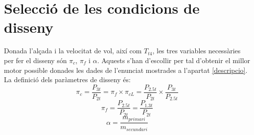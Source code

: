 \section{Selecció de les condicions de disseny}
Donada l'alçada i la velocitat de vol, així com $T_{t4}$, les tres variables necessàries per fer el disseny són $\pi_c$, $\pi_f$ i $\alpha$. Aquests s'han d'escollir per tal d'obtenir el millor motor possible donades les dades de l'enunciat mostrades a l'apartat \ref{descripcio}.
La definició dels paràmetres de disseny és:
\begin{equation*}
	\pi_c = \frac{P_{3t}}{P_{2t}} = \pi_{f}\times\pi_{cL} = \frac{P_{2.5t}}{P_{2t}} \times \frac{P_{3t}}{P_{2.5t}}
\end{equation*}
\begin{equation*}
	\pi_f = \frac{P_{2.5t}}{P_{2t}} = \frac{P_{1.3t}}{P_{2t}} 
\end{equation*}
\begin{equation*}
	\alpha = \frac{m_{primari}}{m_{secundari}}
\end{equation*}

